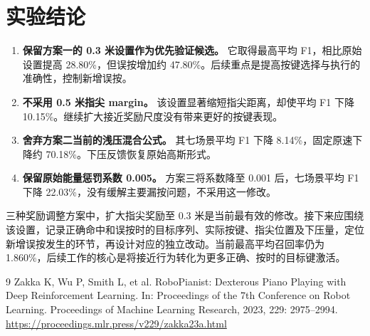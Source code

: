 \documentclass[UTF8,a4paper,11pt]{ctexart}
\begin{document}
\section{实验结论}

\begin{enumerate}
\item \textbf{保留方案一的 0.3 米设置作为优先验证候选。}
它取得最高平均 F1，相比原始设置提高 28.80\%，但误按增加约 47.80\%。后续重点是提高按键选择与执行的准确性，控制新增误按。

\item \textbf{不采用 0.5 米指尖 margin。}
该设置显著缩短指尖距离，却使平均 F1 下降 10.15\%。继续扩大接近奖励尺度没有带来更好的按键表现。

\item \textbf{舍弃方案二当前的浅压混合公式。}
其七场景平均 F1 下降 8.14\%，固定原速下降约 70.18\%。下压反馈恢复原始高斯形式。

\item \textbf{保留原始能量惩罚系数 0.005。}
方案三将系数降至 0.001 后，七场景平均 F1 下降 22.03\%，没有缓解主要漏按问题，不采用这一修改。
\end{enumerate}

三种奖励调整方案中，扩大指尖奖励至 0.3 米是当前最有效的修改。接下来应围绕该设置，记录正确命中和误按时的目标序列、实际按键、指尖位置及下压量，定位新增误按发生的环节，再设计对应的独立改动。当前最高平均召回率仍为 1.860\%，后续工作的核心是将接近行为转化为更多正确、按时的目标键激活。

\begin{thebibliography}{9}
Zakka K, Wu P, Smith L, et al.
RoboPianist: Dexterous Piano Playing with Deep Reinforcement Learning.
In: Proceedings of the 7th Conference on Robot Learning.
Proceedings of Machine Learning Research,
2023, 229: 2975--2994.
\url{https://proceedings.mlr.press/v229/zakka23a.html}
\end{thebibliography}
\end{document}

